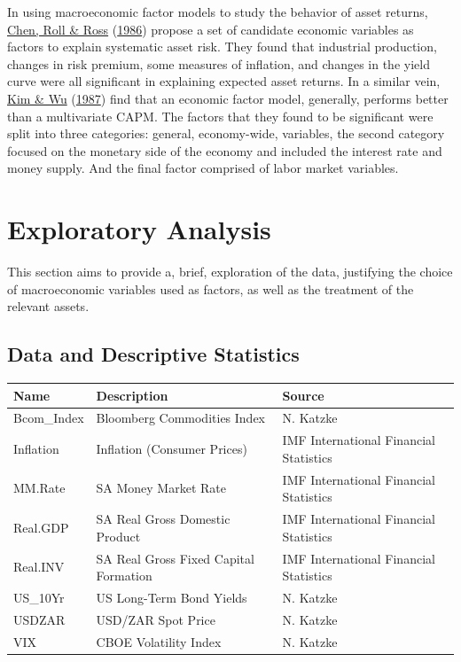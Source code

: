 \documentclass[11pt,preprint, authoryear]{elsarticle}
\let\origtable\table
\let\endorigtable\endtable
\renewenvironment{table}[1][2] {
    \expandafter\origtable\expandafter[H]
} {
    \endorigtable
}
\numberwithin{equation}{section}
\numberwithin{figure}{section}
\numberwithin{table}{section}
\begin{document}
In using macroeconomic factor models to study the behavior of asset
returns, \protect\hyperlink{ref-Chen1986}{Chen, Roll \& Ross}
(\protect\hyperlink{ref-Chen1986}{1986}) propose a set of candidate
economic variables as factors to explain systematic asset risk. They
found that industrial production, changes in risk premium, some measures
of inflation, and changes in the yield curve were all significant in
explaining expected asset returns. In a similar vein,
\protect\hyperlink{ref-Kim1987}{Kim \& Wu}
(\protect\hyperlink{ref-Kim1987}{1987}) find that an economic factor
model, generally, performs better than a multivariate CAPM. The factors
that they found to be significant were split into three categories:
general, economy-wide, variables, the second category focused on the
monetary side of the economy and included the interest rate and money
supply. And the final factor comprised of labor market variables.

\hypertarget{exploratory-analysis}{%
\section{\texorpdfstring{Exploratory Analysis
\label{Explor}}{Exploratory Analysis }}\label{exploratory-analysis}}

This section aims to provide a, brief, exploration of the data,
justifying the choice of macroeconomic variables used as factors, as
well as the treatment of the relevant assets.

\hypertarget{data-and-descriptive-statistics}{%
\subsection{Data and Descriptive
Statistics}\label{data-and-descriptive-statistics}}

\begin{table}[H]

\caption{\label{tab:Factors Description}Macroeconomic Factors}
\centering
\begin{tabular}[t]{l|l|l}
\hline
Name & Description & Source\\
\hline
Bcom\_Index & Bloomberg Commodities Index & N. Katzke\\
\hline
Inflation & Inflation (Consumer Prices) & IMF International Financial Statistics\\
\hline
MM.Rate & SA Money Market Rate & IMF International Financial Statistics\\
\hline
Real.GDP & SA Real Gross Domestic Product & IMF International Financial Statistics\\
\hline
Real.INV & SA Real Gross Fixed Capital Formation & IMF International Financial Statistics\\
\hline
US\_10Yr & US Long-Term Bond Yields & N. Katzke\\
\hline
USDZAR & USD/ZAR Spot Price & N. Katzke\\
\hline
VIX & CBOE Volatility Index & N. Katzke\\
\hline
\end{tabular}
\end{table}
\end{document}
